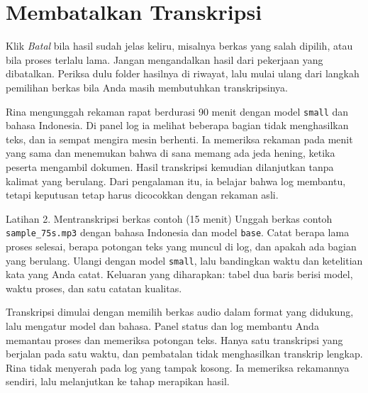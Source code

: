 \section{Membatalkan Transkripsi}
Klik \emph{Batal} bila hasil sudah jelas keliru, misalnya berkas yang salah dipilih, atau bila proses terlalu lama. Jangan mengandalkan hasil dari pekerjaan yang dibatalkan. Periksa dulu folder hasilnya di riwayat, lalu mulai ulang dari langkah pemilihan berkas bila Anda masih membutuhkan transkripsinya.

\begin{ilustrasi}
Rina mengunggah rekaman rapat berdurasi 90 menit dengan model \texttt{small} dan bahasa Indonesia. Di panel log ia melihat beberapa bagian tidak menghasilkan teks, dan ia sempat mengira mesin berhenti. Ia memeriksa rekaman pada menit yang sama dan menemukan bahwa di sana memang ada jeda hening, ketika peserta mengambil dokumen. Hasil transkripsi kemudian dilanjutkan tanpa kalimat yang berulang. Dari pengalaman itu, ia belajar bahwa log membantu, tetapi keputusan tetap harus dicocokkan dengan rekaman asli.
\end{ilustrasi}

\begin{kegiatan}{Latihan 2. Mentranskripsi berkas contoh (15 menit)}
Unggah berkas contoh \texttt{sample\_75s.mp3} dengan bahasa Indonesia dan model \texttt{base}. Catat berapa lama proses selesai, berapa potongan teks yang muncul di log, dan apakah ada bagian yang berulang. Ulangi dengan model \texttt{small}, lalu bandingkan waktu dan ketelitian kata yang Anda catat. Keluaran yang diharapkan: tabel dua baris berisi model, waktu proses, dan satu catatan kualitas.
\end{kegiatan}

\begin{rangkuman}
Transkripsi dimulai dengan memilih berkas audio dalam format yang didukung, lalu mengatur model dan bahasa. Panel status dan log membantu Anda memantau proses dan memeriksa potongan teks. Hanya satu transkripsi yang berjalan pada satu waktu, dan pembatalan tidak menghasilkan transkrip lengkap. Rina tidak menyerah pada log yang tampak kosong. Ia memeriksa rekamannya sendiri, lalu melanjutkan ke tahap merapikan hasil.
\end{rangkuman}
